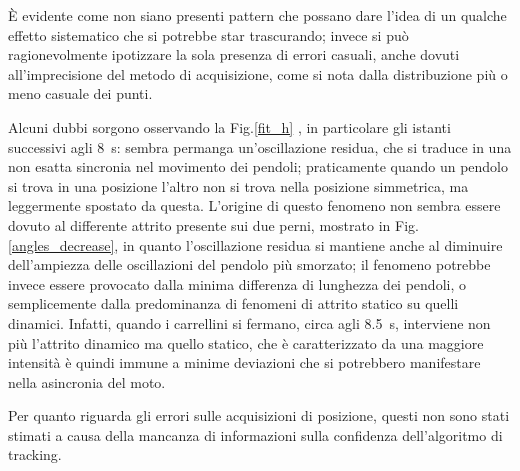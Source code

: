 \documentclass[11pt, a4paper, twoside]{article}
\begin{document}
È evidente come non siano presenti pattern che possano dare l'idea di un qualche effetto
sistematico che si potrebbe star trascurando; invece si può ragionevolmente ipotizzare la sola 
presenza di errori casuali, anche dovuti all'imprecisione del metodo di acquisizione, come si nota
dalla distribuzione più o meno casuale dei punti.

Alcuni dubbi sorgono osservando la Fig.\ref{fit_h}
, in particolare gli istanti successivi agli \SI{8}{\s}: sembra permanga un'oscillazione
residua, che si traduce in una non esatta sincronia nel movimento dei pendoli; 
praticamente quando un pendolo si trova in una posizione l'altro non si trova nella 
posizione simmetrica, ma leggermente spostato da questa.
L'origine di questo fenomeno non sembra essere dovuto al differente
attrito presente sui due perni, mostrato in Fig.\ref{angles_decrease}, in quanto
l'oscillazione residua si mantiene anche al diminuire dell'ampiezza delle
oscillazioni del pendolo più smorzato; il fenomeno potrebbe invece essere 
provocato dalla minima differenza di lunghezza 
dei pendoli, o semplicemente dalla predominanza di fenomeni di attrito statico 
su quelli dinamici.
Infatti, quando i carrellini si fermano, circa agli \SI{8.5}{\s}, interviene non
più l'attrito dinamico ma quello statico, che è caratterizzato da una maggiore intensità
è quindi immune a minime deviazioni che si potrebbero manifestare nella asincronia del moto.

Per quanto riguarda gli errori sulle acquisizioni di posizione, questi non sono stati
stimati a causa della mancanza di informazioni sulla confidenza dell'algoritmo di tracking.
\end{document}
